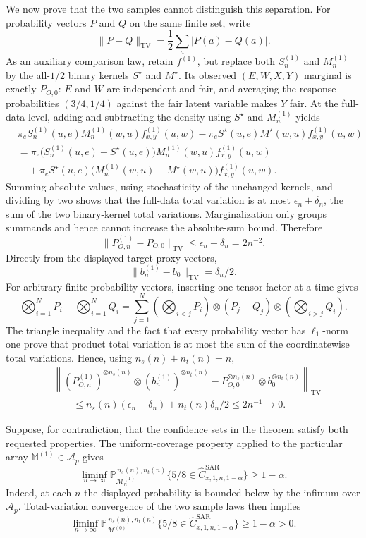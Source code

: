 We now prove that the two samples cannot distinguish this separation. For probability vectors \(P\) and \(Q\) on the same finite set, write
\[
\lVert P-Q\rVert_{\mathrm{TV}}=\frac12\sum_a|P(a)-Q(a)|.
\]
As an auxiliary comparison law, retain \(f^{(1)}\), but replace both \(S^{(1)}_n\) and \(M^{(1)}_n\) by the all-\(1/2\) binary kernels \(S^{\star}\) and \(M^{\star}\). Its observed \((E,W,X,Y)\) marginal is exactly \(P_{O,0}\): \(E\) and \(W\) are independent and fair, and averaging the response probabilities \((3/4,1/4)\) against the fair latent variable makes \(Y\) fair. At the full-data level, adding and subtracting the density using \(S^{\star}\) and \(M^{(1)}_n\) yields
\[
\begin{split}
&\pi_eS^{(1)}_n(u,e)M^{(1)}_n(w,u)f^{(1)}_{x,y}(u,w)
-\pi_eS^{\star}(u,e)M^{\star}(w,u)f^{(1)}_{x,y}(u,w)\\
&=\pi_e\bigl(S^{(1)}_n(u,e)-S^{\star}(u,e)\bigr)
M^{(1)}_n(w,u)f^{(1)}_{x,y}(u,w)\\
&\quad+\pi_eS^{\star}(u,e)
\bigl(M^{(1)}_n(w,u)-M^{\star}(w,u)\bigr)
f^{(1)}_{x,y}(u,w).
\end{split}
\]
Summing absolute values, using stochasticity of the unchanged kernels, and dividing by two shows that the full-data total variation is at most \(\epsilon_n+\delta_n\), the sum of the two binary-kernel total variations. Marginalization only groups summands and hence cannot increase the absolute-sum bound. Therefore
\[
\lVert P^{(1)}_{O,n}-P_{O,0}\rVert_{\mathrm{TV}}
\le\epsilon_n+\delta_n=2n^{-2}.
\]
Directly from the displayed target proxy vectors,
\[
\lVert b^{(1)}_n-b_0\rVert_{\mathrm{TV}}=\delta_n/2.
\]
For arbitrary finite probability vectors, inserting one tensor factor at a time gives
\[
\bigotimes_{i=1}^N P_i-\bigotimes_{i=1}^N Q_i
=\sum_{j=1}^N
\left(\bigotimes_{i<j}P_i\right)\otimes(P_j-Q_j)\otimes
\left(\bigotimes_{i>j}Q_i\right).
\]
The triangle inequality and the fact that every probability vector has \(\ell_1\)-norm one prove that product total variation is at most the sum of the coordinatewise total variations. Hence, using \(n_s(n)+n_t(n)=n\),
\[
\begin{split}
&\left\lVert
(P^{(1)}_{O,n})^{\otimes n_s(n)}\otimes(b^{(1)}_n)^{\otimes n_t(n)}
-P_{O,0}^{\otimes n_s(n)}\otimes b_0^{\otimes n_t(n)}
\right\rVert_{\mathrm{TV}}\\
&\qquad\le n_s(n)(\epsilon_n+\delta_n)+n_t(n)\delta_n/2
\le2n^{-1}\longrightarrow0.
\end{split}
\]

Suppose, for contradiction, that the confidence sets in the theorem satisfy both requested properties. The uniform-coverage property applied to the particular array \(\mathbb M^{(1)}\in\mathcal A_p\) gives
\[
\liminf_{n\to\infty}
\mathbb P_{\mathcal M^{(1)}_n}^{\,n_s(n),n_t(n)}
\{5/8\in\widehat C^{\mathrm{SAR}}_{x,1,n,1-\alpha}\}
\ge1-\alpha.
\]
Indeed, at each \(n\) the displayed probability is bounded below by the infimum over \(\mathcal A_p\). Total-variation convergence of the two sample laws then implies
\[
\liminf_{n\to\infty}
\mathbb P_{\mathcal M^{(0)}}^{\,n_s(n),n_t(n)}
\{5/8\in\widehat C^{\mathrm{SAR}}_{x,1,n,1-\alpha}\}
\ge1-\alpha>0. \tag{1}
\]

